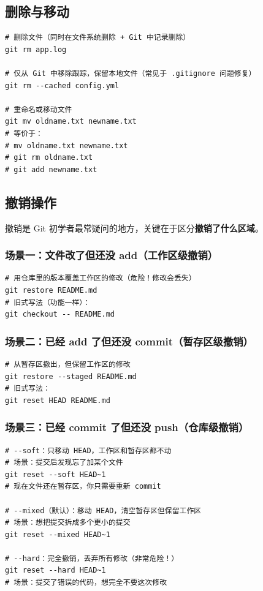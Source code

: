 \documentclass[12pt,a4paper]{article}
\begin{document}
\subsection{删除与移动}

\begin{lstlisting}
# 删除文件（同时在文件系统删除 + Git 中记录删除）
git rm app.log

# 仅从 Git 中移除跟踪，保留本地文件（常见于 .gitignore 问题修复）
git rm --cached config.yml

# 重命名或移动文件
git mv oldname.txt newname.txt
# 等价于：
# mv oldname.txt newname.txt
# git rm oldname.txt
# git add newname.txt
\end{lstlisting}

\subsection{撤销操作}

撤销是 Git 初学者最常疑问的地方，关键在于区分\textbf{撤销了什么区域}。

\subsubsection{场景一：文件改了但还没 add（工作区级撤销）}

\begin{lstlisting}
# 用仓库里的版本覆盖工作区的修改（危险！修改会丢失）
git restore README.md
# 旧式写法（功能一样）：
git checkout -- README.md
\end{lstlisting}

\subsubsection{场景二：已经 add 了但还没 commit（暂存区级撤销）}

\begin{lstlisting}
# 从暂存区撤出，但保留工作区的修改
git restore --staged README.md
# 旧式写法：
git reset HEAD README.md
\end{lstlisting}

\subsubsection{场景三：已经 commit 了但还没 push（仓库级撤销）}

\begin{lstlisting}
# --soft：只移动 HEAD，工作区和暂存区都不动
# 场景：提交后发现忘了加某个文件
git reset --soft HEAD~1
# 现在文件还在暂存区，你只需要重新 commit

# --mixed（默认）：移动 HEAD，清空暂存区但保留工作区
# 场景：想把提交拆成多个更小的提交
git reset --mixed HEAD~1

# --hard：完全撤销，丢弃所有修改（非常危险！）
git reset --hard HEAD~1
# 场景：提交了错误的代码，想完全不要这次修改
\end{lstlisting}
\end{document}
